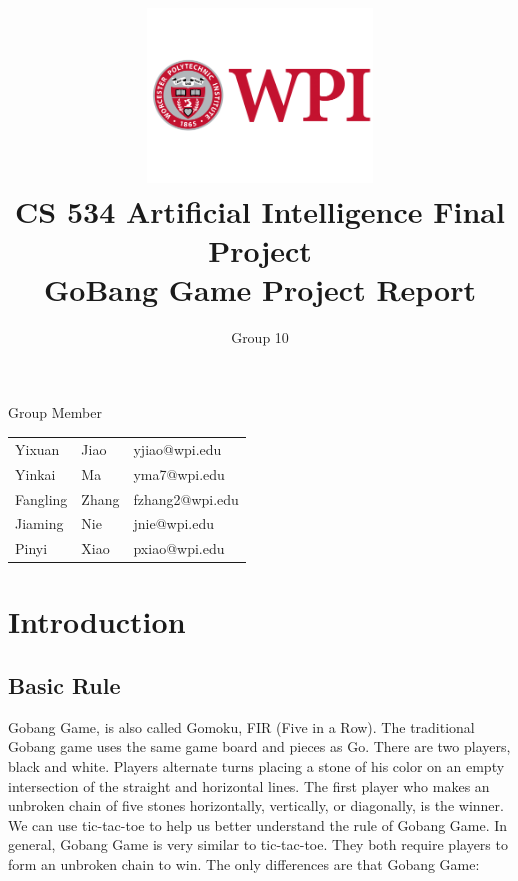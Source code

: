 \documentclass[11pt, a4paper]{article}
\title{\includegraphics[width=0.45\textwidth]{wpi2}
        \\CS 534 Artificial Intelligence Final Project \\ GoBang Game Project Report}          %
\author{Group 10 }                    %
\begin{document}
\begin{titlepage}
	
\maketitle
{} %

\begin{center}
Group Member
\end{center}

\begin{table}[htbp] 
\begin{center}
\begin{tabular}{l l l} 
	 
	 
	 Yixuan & Jiao  &   yjiao@wpi.edu \\
     Yinkai & Ma  &   yma7@wpi.edu \\
     Fangling & Zhang  & fzhang2@wpi.edu         \\
     Jiaming & Nie  &  jnie@wpi.edu \\
     Pinyi & Xiao  &  pxiao@wpi.edu \\
\end{tabular}
\end{center}
\end{table}



\thispagestyle{empty}  %

\end{titlepage}

\tableofcontents

\newpage

\section{Introduction}

\subsection{Basic Rule}

Gobang Game, is also called Gomoku, FIR (Five in a Row). The traditional Gobang game uses the same game board and pieces as Go. There are two players, black and white. Players alternate turns placing a stone of his color on an empty intersection of the straight and horizontal lines. The first player who makes an unbroken chain of five stones horizontally, vertically, or diagonally, is the winner.
We can use tic-tac-toe to help us better understand the rule of Gobang Game. In general, Gobang Game is very similar to tic-tac-toe. They both require players to form an unbroken chain to win. The only differences are that Gobang Game:
\end{document}
